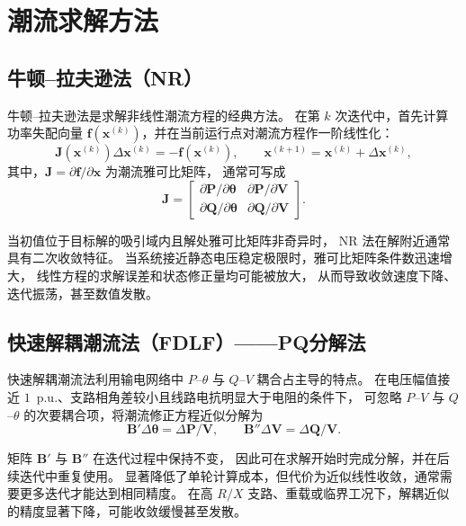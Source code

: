 \section{潮流求解方法}
\label{sec:methods}

\subsection{牛顿--拉夫逊法（NR）}

牛顿--拉夫逊法是求解非线性潮流方程的经典方法\cite{tinney1967}。
在第 $k$ 次迭代中，首先计算功率失配向量
$\bm{f}(\bm{x}^{(k)})$，并在当前运行点对潮流方程作一阶线性化：
\begin{equation}
\bm{J}(\bm{x}^{(k)})\Delta\bm{x}^{(k)}
=-\bm{f}(\bm{x}^{(k)}),
\qquad
\bm{x}^{(k+1)}=\bm{x}^{(k)}+\Delta\bm{x}^{(k)},
\label{eq:nr-iteration}
\end{equation}
其中，$\bm{J}=\partial\bm{f}/\partial\bm{x}$ 为潮流雅可比矩阵，
通常可写成
\begin{equation}
\bm{J}=
\begin{bmatrix}
\partial\bm{P}/\partial\bm{\theta} &
\partial\bm{P}/\partial\bm{V}\\
\partial\bm{Q}/\partial\bm{\theta} &
\partial\bm{Q}/\partial\bm{V}
\end{bmatrix}.
\end{equation}

当初值位于目标解的吸引域内且解处雅可比矩阵非奇异时，
NR 法在解附近通常具有二次收敛特征。
当系统接近静态电压稳定极限时，雅可比矩阵条件数迅速增大，
线性方程的求解误差和状态修正量均可能被放大，
从而导致收敛速度下降、迭代振荡，甚至数值发散。

\subsection{快速解耦潮流法（FDLF）——PQ分解法}

快速解耦潮流法利用输电网络中
$P$--$\theta$ 与 $Q$--$V$ 耦合占主导的特点\cite{stott1974}。
在电压幅值接近 $1$~p.u.、支路相角差较小且线路电抗明显大于电阻的条件下，
可忽略 $P$--$V$ 与 $Q$--$\theta$ 的次要耦合项，将潮流修正方程近似分解为
\begin{equation}
\bm{B}'\Delta\bm{\theta}
=\Delta\bm{P}/\bm{V},
\qquad
\bm{B}''\Delta\bm{V}
=\Delta\bm{Q}/\bm{V}.
\label{eq:fdlf-iteration}
\end{equation}

矩阵 $\bm{B}'$ 与 $\bm{B}''$ 在迭代过程中保持不变，
因此可在求解开始时完成分解，并在后续迭代中重复使用。
显著降低了单轮计算成本，但代价为近似线性收敛，通常需要更多迭代才能达到相同精度。
在高 $R/X$ 支路、重载或临界工况下，解耦近似的精度显著下降，可能收敛缓慢甚至发散。

